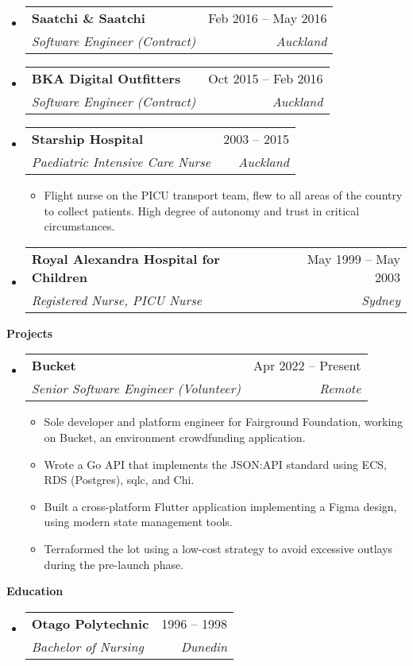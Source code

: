 \documentclass[12pt]{article}
\makeatletter
\def \entryspacing {-0em}
\renewcommand{\section}[2]{\vspace{0.5ex}
  \colorbox{secondary}{\color{white}\raggedbottom\normalsize\textbf{{#1}{\hspace{0.5em}#2}}}
}
\newcommand{\resumeEntryStart}{\begin{itemize}[leftmargin=2.5mm]}
\newcommand{\resumeEntryEnd}{\end{itemize}\vspace{\entryspacing}}
\newcommand{\resumeItemListStart}{\begin{itemize}[leftmargin=4.5mm]}
\newcommand{\resumeItemListEnd}{\end{itemize}}
\newcommand{\resumeItem}[1]{
  \item\small{
    {#1 \vspace{-0.9ex}}
  }
}
\newcommand{\resumeEntryTSDL}[4]{
  \vspace{-0.5ex}\item[]
    \begin{tabularx}{0.97\textwidth}{X@{\hspace{5em}}r}
      \textbf{\color{primary}#1} & {\firabook\color{accent}\small#2} \\
      \textit{\color{accent}\small#3} & \textit{\color{accent}\small#4} \\
    \end{tabularx}\vspace{-0.9ex}
}
\makeatother
\begin{document}
  \resumeEntryStart
    \resumeEntryTSDL
      {Saatchi \& Saatchi}{Feb 2016 -- May 2016}
      {Software Engineer (Contract)}{Auckland}
  \resumeEntryEnd

  \resumeEntryStart
    \resumeEntryTSDL
      {BKA Digital Outfitters}{Oct 2015 -- Feb 2016}
      {Software Engineer (Contract)}{Auckland}
  \resumeEntryEnd


  \resumeEntryStart
    \resumeEntryTSDL
      {Starship Hospital}{2003 -- 2015}
      {Paediatric Intensive Care Nurse}{Auckland}
    \resumeItemListStart
      \resumeItem {Flight nurse on the PICU transport team, flew to all areas of the country to collect patients. High degree of autonomy and trust in critical circumstances.}
    \resumeItemListEnd
  \resumeEntryEnd

  \resumeEntryStart
    \resumeEntryTSDL
      {Royal Alexandra Hospital for Children}{May 1999 -- May 2003}
      {Registered Nurse, PICU Nurse}{Sydney}
  \resumeEntryEnd

\section{\faFlask}{Projects}

  \resumeEntryStart
    \resumeEntryTSDL
      {Bucket}{Apr 2022 -- Present}
      {Senior Software Engineer (Volunteer)}{Remote}
    \resumeItemListStart
      \resumeItem {Sole developer and platform engineer for Fairground Foundation, working on Bucket, an environment crowdfunding application.}
      \resumeItem {Wrote a Go API that implements the JSON:API standard using ECS, RDS (Postgres), sqlc, and Chi.}
      \resumeItem {Built a cross-platform Flutter application implementing a Figma design, using modern state management tools.}
      \resumeItem {Terraformed the lot using a low-cost strategy to avoid excessive outlays during the pre-launch phase.}
    \resumeItemListEnd
  \resumeEntryEnd

\section{\faGraduationCap}{Education}

  \resumeEntryStart
    \resumeEntryTSDL
      {Otago Polytechnic}{1996 -- 1998}
      {Bachelor of Nursing}{Dunedin}
  \resumeEntryEnd
\end{document}
